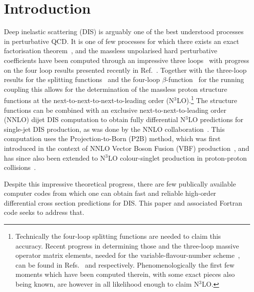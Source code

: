\documentclass[submission, PhysCodeb]{SciPost_better_arXiv}
\newcommand{\nnlojet}{NNLO{\sc{jet}}}
\newcommand{\NNNLO}{N$^3$LO}
\begin{document}
\section{Introduction}
\label{sec:intro}
Deep inelastic scattering (DIS) is arguably one of the best understood
processes in perturbative QCD. It is one of few processes for which
there exists an exact factorisation
theorem~\cite{Collins:1987pm,Collins:1989gx}, and the massless
unpolarised hard perturbative coefficients have been computed through
an impressive three
loops~\cite{SanchezGuillen:1990iq,vanNeerven:1991nn,Zijlstra:1992qd,Zijlstra:1992kj,vanNeerven:1999ca,vanNeerven:2000uj,Moch:1999eb,Moch:2004xu,Vermaseren:2005qc,Vogt:2006bt,Moch:2007rq,Davies:2016ruz,Blumlein:2022gpp}
with progress on the four loop results presented recently in
Ref.~\cite{Moch:2022frw}. Together with the three-loop results for the
splitting functions~\cite{Moch:2004pa,Vogt:2004mw,Blumlein:2021enk}
and the four-loop
$\beta$-function~\cite{vanRitbergen:1997va,Czakon:2004bu} for the
running coupling this allows for the determination of the massless
proton structure functions at the next-to-next-to-next-to-leading
order (\NNNLO{}).\footnote{\label{n3lo-note}Technically the four-loop
splitting functions are needed to claim this accuracy. Recent progress
in determining those and the three-loop massive operator matrix
elements, needed for the variable-flavour-number
scheme~\cite{Buza:1996wv}, can be found in
Refs.~\cite{Moch:2021qrk,Falcioni:2023luc,Falcioni:2023vqq,Gehrmann:2023cqm,Falcioni:2023tzp,Moch:2023tdj,Gehrmann:2023iah,Falcioni:2024xyt}
and
\cite{Bierenbaum:2009mv,Kawamura:2012cr,ABLINGER2014263,Ablinger:2014vwa,Ablinger:2014nga,Ablinger:2022wbb,Ablinger:2023ahe,Ablinger:2024xtt}
respectively. Phenomenologically the first few moments which have been
computed therein, with some exact pieces also being known, are however
in all likelihood enough to claim \NNNLO{}. } The structure functions
can be combined with an exclusive next-to-next-to-leading order (NNLO)
dijet DIS computation to obtain fully differential \NNNLO{}
predictions for single-jet DIS production, as was done by the
\nnlojet{}
collaboration~\cite{Currie:2016ytq,Currie:2018fgr,Gehrmann:2018odt}. This
computation uses the Projection-to-Born (P2B) method, which was first
introduced in the context of NNLO Vector Boson Fusion (VBF)
production~\cite{Cacciari:2015jma}, and has since also been extended
to \NNNLO{} colour-singlet production in proton-proton
collisions~\cite{Chen:2021isd,Chen:2021vtu}.

Despite this impressive theoretical progress, there are few publically
available computer codes from which one can obtain fast and reliable
high-order differential cross section predictions for DIS. This paper
and associated Fortran code seeks to address that.
\end{document}
